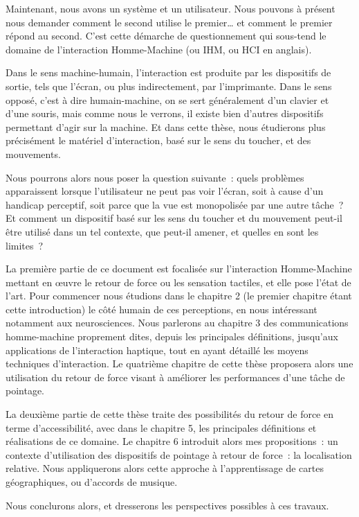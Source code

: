 \documentclass[
]{book}
\begin{document}
Maintenant, nous avons un système et un utilisateur. Nous pouvons à
présent nous demander comment le second utilise le premier\ldots{} et comment le
premier répond au second. C'est cette démarche de questionnement qui
sous-tend le domaine de l'interaction Homme-Machine (ou IHM, ou HCI en
anglais).

Dans le sens machine-humain, l'interaction est produite par les
dispositifs de sortie, tels que l'écran, ou plus indirectement, par
l'imprimante. Dans le sens opposé, c'est à dire humain-machine, on se sert
généralement d'un clavier et d'une souris, mais comme nous le verrons, il
existe bien d'autres dispositifs permettant d'agir sur la machine. Et dans
cette thèse, nous étudierons plus précisément le matériel d'interaction, basé
sur le sens du toucher, et des mouvements.

Nous pourrons alors nous poser la question suivante~: quels problèmes
apparaissent lorsque l'utilisateur ne peut pas voir l'écran, soit à cause
d'un handicap perceptif, soit parce que la vue est monopolisée par une autre
tâche~? Et comment un dispositif basé sur les sens du toucher et du
mouvement peut-il être utilisé dans un tel contexte, que peut-il amener, et
quelles en sont les limites~?

La première partie de ce document est focalisée sur l'interaction
Homme-Machine mettant en œuvre le retour de force ou les sensation tactiles,
et elle pose l'état de l'art. Pour commencer nous étudions dans le chapitre 2
(le premier chapitre étant cette introduction) le côté humain de ces
perceptions, en nous intéressant notamment aux neurosciences. Nous parlerons
au chapitre 3 des communications homme-machine proprement dites, depuis les
principales définitions, jusqu'aux applications de l'interaction haptique,
tout en ayant détaillé les moyens techniques d'interaction. Le quatrième
chapitre de cette thèse proposera alors une utilisation du retour de force
visant à améliorer les performances d'une tâche de pointage.

La deuxième partie de cette thèse traite des possibilités du retour de
force en terme d'accessibilité, avec dans le chapitre 5, les principales
définitions et réalisations de ce domaine. Le chapitre 6 introduit alors mes
propositions~: un contexte d'utilisation des dispositifs de pointage à retour
de force~: la localisation relative. Nous appliquerons alors cette approche à
l'apprentissage de cartes géographiques, ou d'accords de musique.

Nous conclurons alors, et dresserons les perspectives possibles à ces
travaux.
\end{document}
